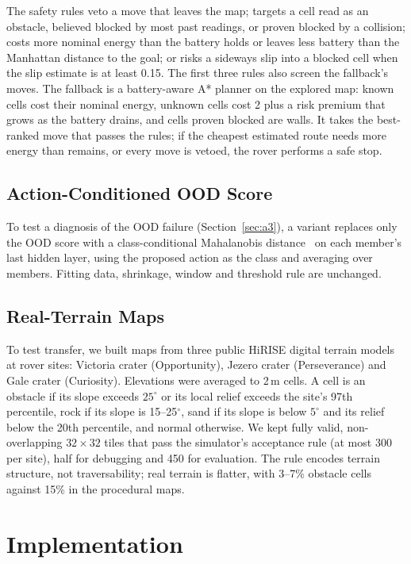 \documentclass[conference]{IEEEtran}
\begin{document}
The safety rules veto a move that leaves the map; targets a cell read as an obstacle, believed blocked by most past
readings, or proven blocked by a collision; costs more nominal energy than the battery holds or leaves less battery than
the Manhattan distance to the goal; or risks a sideways slip into a blocked cell when the slip estimate is at least 0.15.
The first three rules also screen the fallback's moves. The fallback is a battery-aware A* planner on the explored map:
known cells cost their nominal energy, unknown cells cost 2 plus a risk premium that grows as the battery drains, and
cells proven blocked are walls. It takes the best-ranked move that passes the rules; if the cheapest estimated route
needs more energy than remains, or every move is vetoed, the rover performs a safe stop.

\subsection{Action-Conditioned OOD Score}
To test a diagnosis of the OOD failure (Section~\ref{sec:a3}), a variant replaces only the OOD score with a
class-conditional Mahalanobis distance~\cite{yang2024ood} on each member's last hidden layer, using the proposed action as
the class and averaging over members. Fitting data, shrinkage, window and threshold rule are unchanged.

\subsection{Real-Terrain Maps}
To test transfer, we built maps from three public HiRISE digital terrain models at rover sites: Victoria crater
(Opportunity), Jezero crater (Perseverance) and Gale crater (Curiosity). Elevations were averaged to 2\,m cells. A cell is
an obstacle if its slope exceeds $25^\circ$ or its local relief exceeds the site's 97th percentile, rock if its slope is
15--25$^\circ$, sand if its slope is below $5^\circ$ and its relief below the 20th percentile, and normal otherwise. We kept
fully valid, non-overlapping $32\times32$ tiles that pass the simulator's acceptance rule (at most 300 per site), half for
debugging and 450 for evaluation. The rule encodes terrain structure, not traversability; real terrain is flatter, with
3--7\% obstacle cells against 15\% in the procedural maps.


\section{Implementation}
\end{document}
